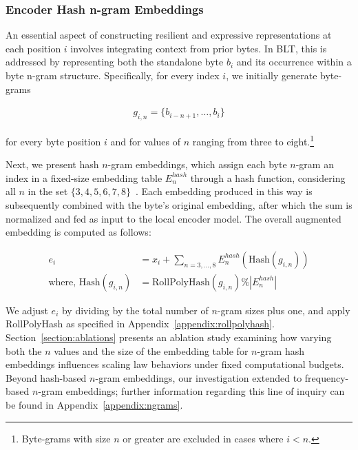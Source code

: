 \subsubsection{Encoder Hash n-gram Embeddings}
\label{sec:ngram-emb}
\label{sec:hash-emb}
An essential aspect of constructing resilient and expressive representations at each position $i$ involves integrating context from prior bytes. In {\textsc BLT}, this is addressed by representing both the standalone byte $b_i$ and its occurrence within a byte n-gram structure. Specifically, for every index $i$, we initially generate byte-grams

\begin{align}
    g_{i,n}=\{b_{i-n + 1},\ldots, b_i\}
\end{align}

for every byte position $i$ and for values of $n$ ranging from three to eight.\footnote{
Byte-grams with size $n$ or greater are excluded in cases where $i < n$. }

Next, we present hash $n$-gram embeddings, which assign each byte $n$-gram an index in a fixed-size embedding table $E_{n}^{hash}$ through a hash function, considering all $n$ in the set $\{3,4,5,6,7,8\}$~\citep{bai2010learning}. 
Each embedding produced in this way is subsequently combined with the byte’s original embedding, after which the sum is normalized and fed as input to the local encoder model. The overall augmented embedding is computed as follows:

\begin{align}
e_i &= x_i + \sum_{n = 3,...,8}E_{n}^{hash}(\text{Hash}(g_{i,n})) \\
\text{where, Hash}(g_{i,n}) &= \text{RollPolyHash}(g_{i,n}) \% |E_{n}^{hash}|
\end{align}

We adjust $e_i$ by dividing by the total number of $n$-gram sizes plus one, and apply RollPolyHash as specified in Appendix~\ref{appendix:rollpolyhash}. Section~\ref{section:ablations} presents an ablation study examining how varying both the $n$ values and the size of the embedding table for $n$-gram hash embeddings influences scaling law behaviors under fixed computational budgets. Beyond hash-based $n$-gram embeddings, our investigation extended to frequency-based $n$-gram embeddings; further information regarding this line of inquiry can be found in Appendix~\ref{appendix:ngrams}.


